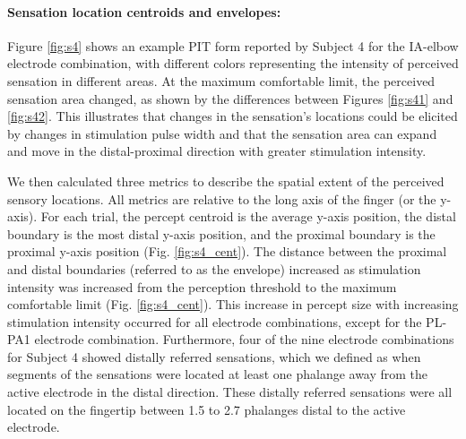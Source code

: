 \documentclass[10pt]{iopart}
\begin{document}
\paragraph{Sensation location centroids and envelopes:}
Figure \ref{fig:s4} shows an example PIT form reported by Subject 4 for the IA-elbow electrode combination, with different colors representing the intensity of perceived sensation in different areas. At the maximum comfortable limit, the perceived sensation area changed, as shown by the differences between Figures \ref{fig:s41} and  \ref{fig:s42}. This illustrates that changes in the sensation's locations could be elicited by changes in stimulation pulse width and that the sensation area can expand and move in the distal-proximal direction with greater stimulation intensity. 

We then calculated three metrics to describe the spatial extent of the perceived sensory locations. All metrics are relative to the long axis of the finger (or the y-axis). For each trial, the percept centroid is the average y-axis position, the distal boundary is the most distal y-axis position, and the proximal boundary is the proximal y-axis position (Fig. \ref{fig:s4_cent}). The distance between the proximal and distal boundaries (referred to as the envelope) increased as stimulation intensity was increased from the perception threshold to the maximum comfortable limit (Fig. \ref{fig:s4_cent}).  This increase in percept size with increasing stimulation intensity occurred for all electrode combinations, except for the PL-PA1 electrode combination. Furthermore, four of the nine electrode combinations for Subject 4 showed distally referred sensations, which we defined as when segments of the sensations were located at least one phalange away from the active electrode in the distal direction. These distally referred sensations were all located on the fingertip between 1.5 to 2.7 phalanges distal to the active electrode.
\end{document}
